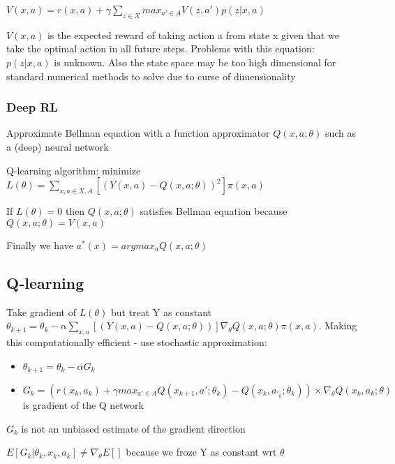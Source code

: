 \documentclass[]{article}
\providecommand{\tightlist}{%
  \setlength{\itemsep}{0pt}\setlength{\parskip}{0pt}}
\begin{document}
\(V(x, a) = r(x, a) + \gamma\sum_{z \in X} max_{a' \in A} V(z, a')p(z|x,a)\)

\(V(x, a)\) is the expected reward of taking action a from state x given
that we take the optimal action in all future steps. Problems with this
equation: \(p(z|x,a)\) is unknown. Also the state space may be too high
dimensional for standard numerical methods to solve due to curse of
dimensionality

\hypertarget{deep-rl}{%
\subsubsection{Deep RL}\label{deep-rl}}

Approximate Bellman equation with a function approximator
\(Q(x, a; \theta)\) such as a (deep) neural network

Q-learning algorithm: minimize
\(L(\theta) = \sum_{x, a \in X, A} [(Y(x, a) - Q(x, a; \theta))^2]\pi(x,a)\)

If \(L(\theta) = 0\) then \(Q(x, a;\theta)\) satisfies Bellman equation
because \(Q(x, a; \theta) = V(x, a)\)

Finally we have \(a^*(x) = argmax_a Q(x, a; \theta)\)

\hypertarget{q-learning}{%
\subsection{Q-learning}\label{q-learning}}

Take gradient of \(L(\theta)\) but treat Y as constant
\(\theta_{k+1} = \theta_k - \alpha \sum_{x, a}[(Y(x, a) - Q(x, a;\theta))]\nabla_\theta Q(x, a; \theta) \pi(x, a)\).
Making this computationally efficient - use stochastic approximation:

\begin{itemize}
\tightlist
\item
  \(\theta_{k+1} = \theta_k - \alpha G_k\)
\item
  \(G_k = (r(x_k, a_k) + \gamma max_{a' \in A}Q(x_{k+1}, a'; \theta_k) - Q(x_{k}, a_'_k; \theta_k)) \times \nabla_\theta Q(x_k, a_k; \theta)\)
  is gradient of the Q network
\end{itemize}

\(G_k\) is not an unbiased estimate of the gradient direction

\(E[G_k | \theta_k, x_k, a_k] \ne \nabla_\theta E[]\) because we froze Y
as constant wrt \(\theta\)
\end{document}

